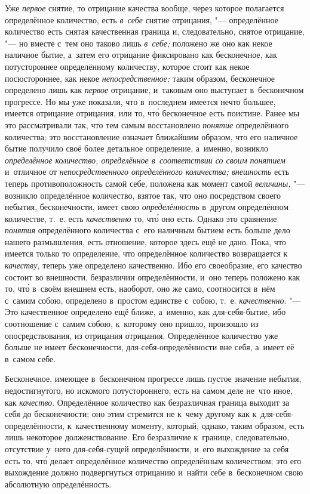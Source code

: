 Уже {\em первое} снятие, то отрицание качества вообще, через которое полагается
определённое количество, есть {\em в~себе} снятие отрицания, "--- определённое
количество есть снятая качественная граница и, следовательно, снятое отрицание,
"--- но вместе с~тем оно таково лишь {\em в~себе;} положено же оно как некое
наличное бытие, а~затем его отрицание фиксировано как бесконечное, как
потустороннее определённому количеству, которое стоит как некое посюстороннее,
как некое {\em непосредственное;} таким образом, бесконечное определено лишь
как {\em первое} отрицание, и~таковым оно выступает в~бесконечном прогрессе.
Но мы уже показали, что в~последнем имеется нечто большее, имеется отрицание
отрицания, или то, чт\'{о} бесконечное есть поистине. Ранее мы это
рассматривали так, что тем самым восстановлено {\em понятие} определённого
количества; это восстановление означает ближайшим образом, что его наличное
бытие получило своё более детальное определение, а~именно, возникло
{\em определённое количество, определённое в~соответствии со своим понятием}
и~отличное от {\em непосредственного определённого количества; внешность} есть
теперь противоположность самой себе, положена как момент самой {\em величины,}
"--- возникло определённое количество, взятое так, что оно посредством своего
небытия, бесконечности, имеет свою {\em определённость} в~другом определённом
количестве, т.~е. есть {\em качественно} то, чт\'{о} оно есть. Однако это
сравнение {\em понятия} определённого количества с~его наличным бытием есть
больше дело нашего размышления, есть отношение, которое здесь ещё не дано.
Пока, что имеется только то определение, что определённое количество
возвращается к {\em качеству,} теперь уже определено качественно. Ибо его
своеобразие, его качество состоит во внешности, безразличии определённости,
и~оно теперь положено как то, чт\'{о} в~своём внешнем есть, наоборот, оно же
само, соотносится в~нём с~самим собою, определено в~простом единстве с~собою,
т.~е. {\em качественно}. "--- Это качественное определено ещё ближе, а~именно,
как для-себя-бытие, ибо соотношение с~самим собою, к~которому оно пришло,
произошло из опосредствования, из отрицания отрицания. Определённое количество
уже больше не имеет бесконечности, для-себя-определённости вне себя,
а~имеет её в~самом себе.

Бесконечное, имеющее в~бесконечном прогрессе лишь пустое значение небытия,
недостигнутого, но искомого потустороннего, есть на самом деле не~что иное,
как {\em качество}. Определённое количество как безразличная граница выходит
за себя до бесконечности; оно этим стремится не к~чему другому как
к~для-себя-определённости, к~качественному моменту, который, однако, таким
образом, есть лишь некоторое долженствование. Его безразличие к~границе,
следовательно, отсутствие у~него для-себя-сущей определённости, и~его
выхождение за себя есть то, чт\'{о} делает определённое количество определённым
количеством; это его выхождение должно подвергнуться отрицанию и~найти
себе в~бесконечном свою абсолютную определённость.

